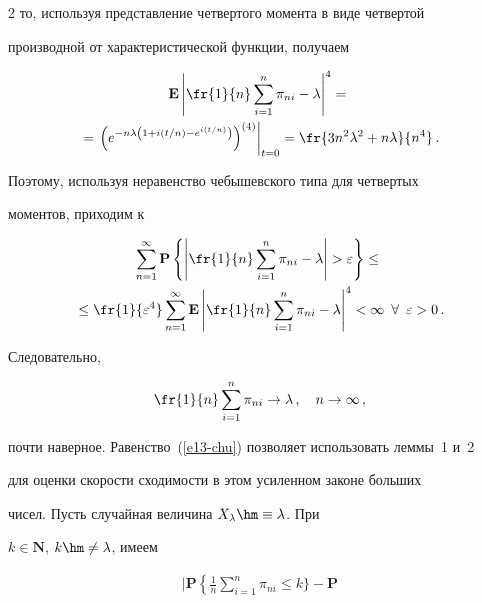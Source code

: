 \begin{multicols}{2}
то, используя представление четвертого момента в виде четвертой


производной от характеристической функции, получаем


\begin{multline*}


\mathbf{E}\left|\fr{1}{n}\sum_{i=1}^n\pi_{ni}-\lambda\right|^4={}\\


{}=


\left.\left(e^{-n\lambda\left(1+i({t}/{n})-e^{i({t}/{n})}\right)}\right)^{(4)}


\right\vert_{t=0}=\fr{3n^2\lambda^2+n\lambda}{n^4}\,.


\end{multline*}


Поэтому, используя неравенство чебышевского типа для четвертых


моментов, приходим к


\begin{multline*}


\sum\limits_{n=1}^{\infty}\mathbf{P}\left\{\left|


\fr{1}{n}\sum_{i=1}^n\pi_{ni}-\lambda\right|>\varepsilon\right\}\le{}\\


{}\le


\fr{1}{\varepsilon^4}\sum\limits_{n=1}^{\infty}\mathbf{E}


\left\vert\fr{1}{n}\sum\limits_{i=1}^n\pi_{ni}-\lambda\right\vert^4<\infty


\,\,\,\forall\,\,\, \varepsilon>0\,.


\end{multline*}


Следовательно,


$$


\fr{1}{n}\sum\limits_{i=1}^n\pi_{ni}\to\lambda\,,\quad


n\to\infty\,,


$$


почти наверное. Равенство~(\ref{e13-chu}) позволяет использовать  леммы~1 и~2


для оценки  скорости сходимости в этом усиленном законе больших


чисел. Пусть случайная величина $X_{\lambda}\hm\equiv\lambda$. При


$k\in\mathbf{N}$, $k\hm\ne \lambda$, имеем


\begin{multline}


\Bigg|\mathbf{P}\left\{\frac{1}{n}\sum_{i=1}^n\pi_{ni}\le k\Bigg\}-\mathbf{P}



\end{multline}
\end{multicols}
